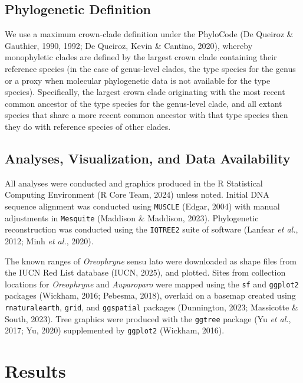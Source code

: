 \documentclass[
  letterpaper,
  DIV=11,
  numbers=noendperiod]{scrartcl}
\begin{document}
\subsection{Phylogenetic Definition}\label{phylogenetic-definition}

We use a maximum crown-clade definition under the PhyloCode (De Queiroz
\& Gauthier, 1990, 1992; De Queiroz, Kevin \& Cantino, 2020), whereby
monophyletic clades are defined by the largest crown clade containing
their reference species (in the case of genus-level clades, the type
species for the genus or a proxy when molecular phylogenetic data is not
available for the type species). Specifically, the largest crown clade
originating with the most recent common ancestor of the type species for
the genus-level clade, and all extant species that share a more recent
common ancestor with that type species then they do with reference
species of other clades.

\subsection{Analyses, Visualization, and Data
Availability}\label{analyses-visualization-and-data-availability}

All analyses were conducted and graphics produced in the R Statistical
Computing Environment (R Core Team, 2024) unless noted. Initial DNA
sequence alignment was conducted using \texttt{MUSCLE} (Edgar, 2004)
with manual adjustments in \texttt{Mesquite} (Maddison \& Maddison,
2023). Phylogenetic reconstruction was conducted using the
\texttt{IQTREE2} suite of software (Lanfear \emph{et al.}, 2012; Minh
\emph{et al.}, 2020).

The known ranges of \emph{Oreophryne} sensu lato were downloaded as
shape files from the IUCN Red List database (IUCN, 2025), and plotted.
Sites from collection locations for \emph{Oreophryne} and
\emph{Auparoparo} were mapped using the \texttt{sf} and \texttt{ggplot2}
packages (Wickham, 2016; Pebesma, 2018), overlaid on a basemap created
using \texttt{rnaturalearth}, \texttt{grid}, and \texttt{ggspatial}
packages (Dunnington, 2023; Massicotte \& South, 2023). Tree graphics
were produced with the \texttt{ggtree} package (Yu \emph{et al.}, 2017;
Yu, 2020) supplemented by \texttt{ggplot2} (Wickham, 2016).

\section{Results}\label{results}
\end{document}

